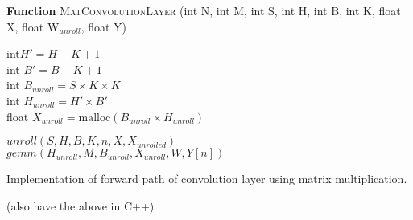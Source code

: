 \documentclass[7pt]{article}
\begin{document}
\begin{algorithm}
	\vspace{0.1in}
	{\textbf{Function} \textsc{MatConvolutionLayer} (int N, int M, int S, int H, int B, int K, float X, float W$_{unroll}$, float Y)}\\

	\vspace{0.05in}

	
	int$H' = H - K + 1$ \\
	int	$B' = B - K + 1$ \\
	int	$B_{unroll} = S \times K \times K$ \\
	int	$H_{unroll} = H' \times B'$ \\
	float $X_{unroll} = \text{malloc}(B_{unroll} \times H_{unroll} )$ \\
	
	
	\vspace{0.05in}

			
					{
						$unroll(S, H, B, K, n, X, X_{unrolled})$ \\
						$gemm(H_{unroll}, M, B_{unroll}, X_{unroll}, W, Y[n])$ \\
					}
				
	
			

	
	\caption{Implementation of forward path of convolution layer using matrix multiplication.}
\end{algorithm}
(also have the above in C++)
\end{document}

